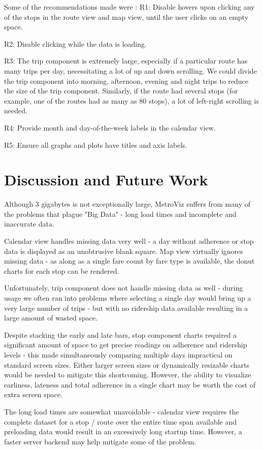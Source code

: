 \documentclass[journal]{vgtc}                %
\begin{document}
Some of the recommendations made were : 
R1: Disable hovers upon clicking any of the stops in the route view and map view, until the user clicks on an empty space. 

R2: Disable clicking while the data is loading. 

R3: The trip component is extremely large, especially if a particular route has many trips per day, necessitating a lot of up and down scrolling. We could divide the trip component into morning, afternoon, evening and night trips to reduce the size of the trip component. Similarly, if the route had several stops (for example, one of the routes had as many as 80 stops), a lot of left-right scrolling is needed. 

R4: Provide month and day-of-the-week labels in the calendar view. 

R5: Ensure all graphs and plots have titles and axis labels.

\section{Discussion and Future Work}
Although 3 gigabytes is not exceptionally large, MetroViz suffers from many of the problems that plague "Big Data" - long load times and incomplete and inaccurate data.

Calendar view handles missing data very well - a day without adherence or stop data is displayed as an unobtrusive blank square. Map view virtually ignores missing data - as along as a single fare count by fare type is available, the donut charts for each stop can be rendered.

Unfortunately, trip component does not handle missing data as well - during usage we often ran into problems where selecting a single day would bring up a very large number of trips - but with no ridership data available resulting in a large amount of wasted space. 

Despite stacking the early and late bars, stop component charts required a significant amount of space to get precise readings on adherence and ridership levels - this made simultaneously comparing multiple days impractical on standard screen sizes. Either larger screen sizes or dynamically resizable charts would be needed to mitigate this shortcoming. However, the ability to visualize earliness, lateness and total adherence in a single chart may be worth the cost of extra screen space.

The long load times are somewhat unavoidable - calendar view requires the complete dataset for a stop / route over the entire time span available and preloading data would result in an excessively long startup time. However, a faster server backend may help mitigate some of the problem.
\end{document}
